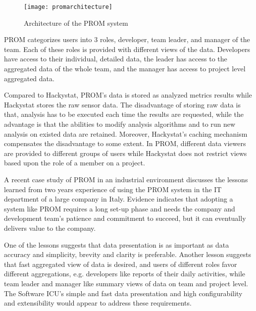 \begin{figure}[htbp]
     \centering
     \texttt{[image: promarchitecture]}
     \caption{Architecture of the PROM system}
     \label{fig:promarchitecture}
\end{figure}

PROM categorizes users into 3 roles, developer, team leader, and manager of the team. Each of these roles is provided with different views of the data. Developers have access to their individual, detailed data, the leader has access to the aggregated data of the whole team, and the manager has access to project level aggregated data.

Compared to Hackystat, PROM's data is stored as analyzed metrics results while Hackystat stores the raw sensor data. The disadvantage of storing raw data is that, analysis has to be executed each time the results are requested, while the advantage is that the abilities to modify analysis algorithms and to run new analysis on existed data are retained. Moreover, Hackystat's caching mechanism compensates the disadvantage to some extent. In PROM, different data viewers are provided to different groups of users while Hackystat does not restrict views based upon the role of a member on a project.

A recent case study of PROM in an industrial environment\cite{prom09} discusses the lessons learned from two years experience of using the PROM system in the IT department of a large company in Italy. Evidence indicates that adopting a system like PROM requires a long set-up phase and needs the company and development team's patience and commitment to succeed, but it can eventually delivers value to the company. 

One of the lessons suggests that data presentation is as important as data accuracy and simplicity, brevity and clarity is preferable. Another lesson suggests that fast aggregated view of data is desired, and users of different roles favor different aggregations, e.g. developers like reports of their daily activities, while team leader and manager like summary views of data on team and project level. The Software ICU's simple and fast data presentation and high configurability and extensibility would appear to address these requirements.

